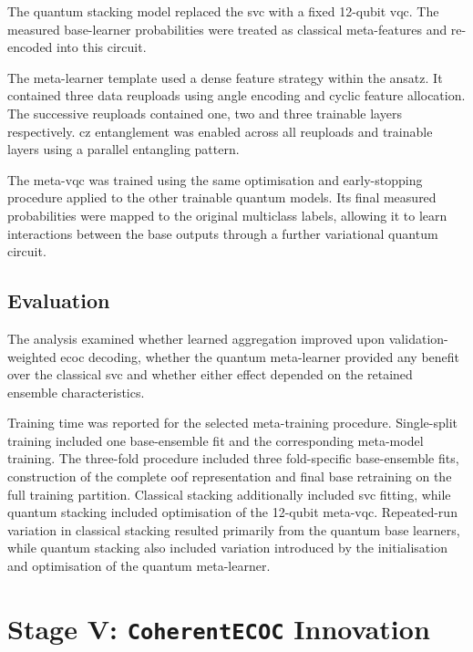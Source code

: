 \documentclass[]{UCD_CS_MSc_AAI_Report}
\begin{document}
The quantum stacking model replaced the \ac{svc} with a fixed 12-qubit \ac{vqc}. The measured base-learner probabilities were treated as classical meta-features and re-encoded into this circuit.

The meta-learner template used a dense feature strategy within the ansatz. It contained three data reuploads using angle encoding and cyclic feature allocation. The successive reuploads contained one, two and three trainable layers respectively. \acs{cz} entanglement was enabled across all reuploads and trainable layers using a parallel entangling pattern.

The meta-\ac{vqc} was trained using the same optimisation and early-stopping procedure applied to the other trainable quantum models. Its final measured probabilities were mapped to the original multiclass labels, allowing it to learn interactions between the base outputs through a further variational quantum circuit.

\subsection{Evaluation}

The analysis examined whether learned aggregation improved upon validation-weighted \ac{ecoc} decoding, whether the quantum meta-learner provided any benefit over the classical \ac{svc} and whether either effect depended on the retained ensemble characteristics.

Training time was reported for the selected meta-training procedure. Single-split training included one base-ensemble fit and the corresponding meta-model training. The three-fold procedure included three fold-specific base-ensemble fits, construction of the complete \ac{oof} representation and final base retraining on the full training partition. Classical stacking additionally included \ac{svc} fitting, while quantum stacking included optimisation of the 12-qubit meta-\ac{vqc}. Repeated-run variation in classical stacking resulted primarily from the quantum base learners, while quantum stacking also included variation introduced by the initialisation and optimisation of the quantum meta-learner.

\section{Stage V: \texttt{CoherentECOC} Innovation}
\label{sec:method-coherent}
\end{document}
